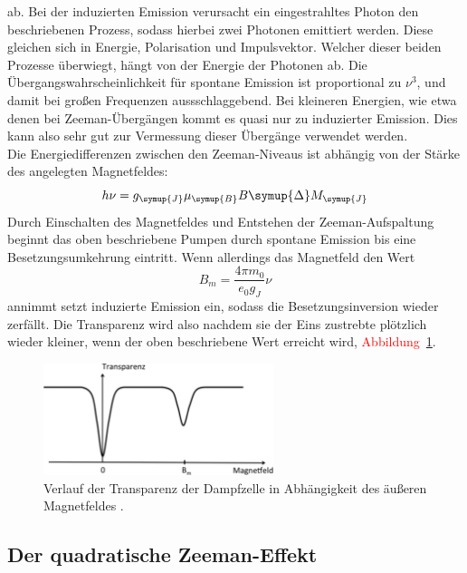 ab. Bei der induzierten Emission verursacht ein eingestrahltes Photon
den beschriebenen Prozess, sodass hierbei zwei Photonen emittiert werden. Diese
gleichen sich in Energie, Polarisation und Impulsvektor. Welcher dieser beiden
Prozesse überwiegt, hängt von der Energie der Photonen ab. Die
Übergangswahrscheinlichkeit für spontane Emission ist proportional zu $\nu^3$,
und damit bei großen Frequenzen aussschlaggebend. Bei kleineren Energien, wie
etwa denen bei Zeeman-Übergängen kommt es quasi nur zu induzierter Emission.
Dies kann also sehr gut zur Vermessung dieser Übergänge verwendet werden. \\
Die Energiedifferenzen zwischen den Zeeman-Niveaus ist abhängig von der Stärke
des angelegten Magnetfeldes:
%
\begin{equation}
  h\nu=g_{\symup{J}}\mu_{\symup{B}}B\symup{\Delta}M_{\symup{J}}
  \label{eq:übergangsenergie}
\end{equation}
%
Durch Einschalten des Magnetfeldes und Entstehen der Zeeman-Aufspaltung beginnt
das oben beschriebene Pumpen durch spontane Emission bis eine
Besetzungsumkehrung eintritt. Wenn allerdings das Magnetfeld den Wert
%
\begin{equation}
  B_m=\frac{4\pi m_0}{e_0g_J}\nu
\end{equation}
%
annimmt setzt induzierte Emission ein, sodass die Besetzungsinversion wieder
zerfällt. Die Transparenz wird also nachdem sie der Eins zustrebte plötzlich
wieder kleiner, wenn der oben beschriebene Wert erreicht wird, \textcolor{red}{Abbildung~\ref{fig:transparenz_b}}.
%
\begin{figure}[htb]
  \centering
  \includegraphics[width=0.6\textwidth]{figures/transparenzkurve.pdf}
  \caption{Verlauf der Transparenz der Dampfzelle in Abhängigkeit des äußeren Magnetfeldes \cite{V21}.}
  \label{fig:transparenz_b}
\end{figure}
%


\subsection{Der quadratische Zeeman-Effekt}

